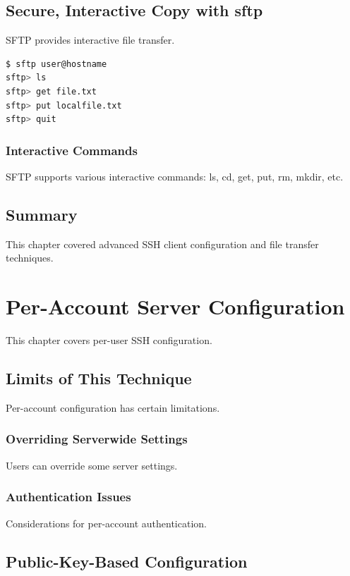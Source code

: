 \documentclass[12pt]{book}
\begin{document}
\section{Secure, Interactive Copy with sftp}

SFTP provides interactive file transfer.

\begin{lstlisting}[language=bash]
$ sftp user@hostname
sftp> ls
sftp> get file.txt
sftp> put localfile.txt
sftp> quit
\end{lstlisting}

\subsection{Interactive Commands}

SFTP supports various interactive commands: ls, cd, get, put, rm, mkdir, etc.

\section{Summary}

This chapter covered advanced SSH client configuration and file transfer techniques.

\chapter{Per-Account Server Configuration}

This chapter covers per-user SSH configuration.

\section{Limits of This Technique}

Per-account configuration has certain limitations.

\subsection{Overriding Serverwide Settings}

Users can override some server settings.

\subsection{Authentication Issues}

Considerations for per-account authentication.

\section{Public-Key-Based Configuration}
\end{document}
